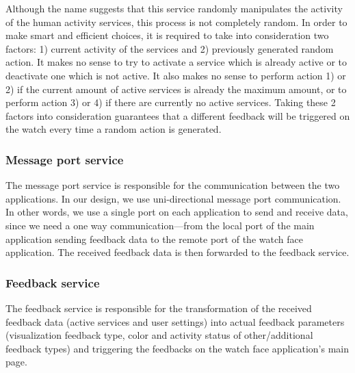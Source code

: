 \documentclass[conference, a4paper, 10pt, twocolumn]{IEEEtran}
\begin{document}
Although the name suggests that this service randomly manipulates the activity of the human activity services, this process is not completely random. In order to make smart and efficient choices, it is required to take into consideration two factors: 1) current activity of the services and 2) previously generated random action. It makes no sense to try to activate a service which is already active or to deactivate one which is not active. It also makes no sense to perform action 1) or 2) if the current amount of active services is already the maximum amount, or to perform action 3) or 4) if there are currently no active services. Taking these 2 factors into consideration guarantees that a different feedback will be triggered on the watch every time a random action is generated.

\subsubsection{\textbf{Message port service}}
The message port service is responsible for the communication between the two applications. In our design, we use uni-directional message port communication. In other words, we use a single port on each application to send and receive data, since we need a one way communication---from the local port of the main application sending feedback data to the remote port of the watch face application. The received feedback data is then forwarded to the feedback service.

\subsubsection{\textbf{Feedback service}}
The feedback service is responsible for the transformation of the received feedback data (active services and user settings) into actual feedback parameters (visualization feedback type, color and activity status of other/additional feedback types) and triggering the feedbacks on the watch face application's main page. 
\end{document}
